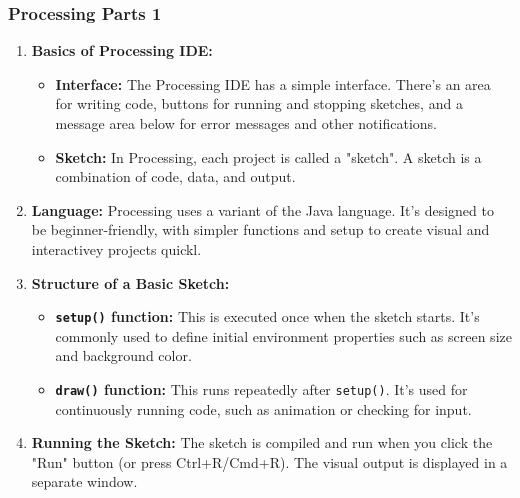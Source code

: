 \documentclass[10pt]{beamer}
\begin{document}

\begin{frame}
\frametitle{Processing Parts 1}
\begin{enumerate}
\item
  \textbf{Basics of Processing IDE:}

  \begin{itemize}
  \item
    \textbf{Interface:} The Processing IDE has a simple interface.
    There's an area for writing code, buttons for running and stopping
    sketches, and a message area below for error messages and other
    notifications.
  \item
    \textbf{Sketch:} In Processing, each project is called a "sketch". A
    sketch is a combination of code, data, and output.
  \end{itemize}
\item
  \textbf{Language:} Processing uses a variant of the Java language.
  It's designed to be beginner-friendly, with simpler functions and
  setup to create visual and interactivey projects quickl.
\item
  \textbf{Structure of a Basic Sketch:}

  \begin{itemize}
  \item
    \textbf{\texttt{setup()} function:} This is executed once when the
    sketch starts. It's commonly used to define initial environment
    properties such as screen size and background color.
  \item
    \textbf{\texttt{draw()} function:} This runs repeatedly after
    \texttt{setup()}. It's used for continuously running code, such as
    animation or checking for input.
  \end{itemize}
\item
  \textbf{Running the Sketch:} The sketch is compiled and run when you
  click the "Run" button (or press Ctrl+R/Cmd+R). The visual output is
  displayed in a separate window.
\end{enumerate}
\end{frame}

\end{document}
